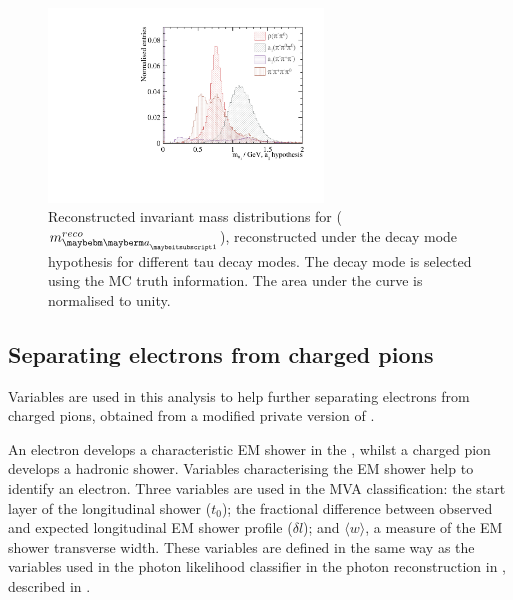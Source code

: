 \begin{figure}[htbp]
\centering
 \includegraphics[width=0.65\textwidth]{tau/var2/mA1A1Fit_100GeV_improved_zoom.pdf}
\caption
{Reconstructed invariant mass distributions for \Pai ($m^{reco}_{\Pai}$), reconstructed under the  \decayAiPhotonShort decay mode hypothesis for different tau decay modes. The decay mode is selected using the MC truth information. The area under the curve is normalised to unity.}
\label{fig:tauVarMA1}
\end{figure}

\subsection{Separating electrons from charged pions}


Variables are used in this analysis to help further separating  electrons from charged pions, obtained from a modified private version of \pandora.



An electron develops a characteristic EM shower in the \ECAL, whilst a charged pion develops a hadronic shower. Variables characterising the  EM shower help to identify an electron. Three variables are used in the MVA classification: the start layer of the longitudinal shower ($t_0$); the fractional difference between observed and expected longitudinal EM shower profile ($\delta{l}$); and $\langle{w}\rangle$, a measure of the EM shower transverse width. These variables are defined in the same way as the variables used in the photon likelihood classifier in the photon reconstruction in \pandora, described in .

